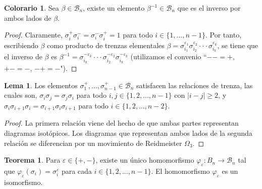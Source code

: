 \documentclass[12pt]{book}
\theoremstyle{definition}
\newtheorem{teor}{Teorema}[section]
\newtheorem{lema}{Lema}[section]
\newtheorem{colo}{Colorario}[section]
\begin{document}
\begin{colo}
\label{lema:inverso}
Sea $\beta\in\mathcal{B}_n$, existe un elemento $\beta^{-1}\in\mathcal{B}_n$ que es el inverso por ambos lados de $\beta$.
\end{colo}
\begin{proof}
Claramente, $\sigma_i^+\sigma_i^- = \sigma_i^-\sigma_i^+=1$ para todo $i\in\{1,\ldots,n-1\}$. Por tanto, escribiendo $\beta$ como producto de trenzas elementales $\beta = \sigma_{i_1}^{\varepsilon_1}\sigma_{i_2}^{\varepsilon_2}\cdot\cdot\cdot\sigma_{i_k}^{\varepsilon_k}$, se tiene que el inverso de $\beta$ es $\beta^{-1} = \sigma_{i_k}^{-\varepsilon_k}\cdot\cdot\cdot\sigma_{i_2}^{-\varepsilon_2}\sigma_{i_k}^{-\varepsilon_k}$ (utilizamos el convenio ``$--=+$, $+-=-$, $-+=-$").
 \end{proof}





\begin{lema}
Los elementos $\sigma_1^+,...,\sigma_{n-1}^+\in\mathcal{B}_n$ satisfacen las relaciones de trenza, las cuales son, $\sigma_i\sigma_j = \sigma_j\sigma_i$ para todo $i,j\in\{1,2,...,n-1\}$ con $|i-j|\geq 2$, y $\sigma_i\sigma_{i+1}\sigma_i =\sigma_{i+1}\sigma_i\sigma_{i+1}$ para todo $i\in\{1,2,...,n-2\}$.
\label{lema:rel_geom}
\end{lema}

\begin{proof} La primera relación viene del hecho de que ambas partes representan diagramas isotópicos. Los diagramas que representan ambos lados de la segunda relación se diferencian por un movimiento de Reidmeister $\Omega_3$.
\end{proof}

\begin{teor}
Para $\varepsilon \in\{+,-\}$, existe un único homomorfismo $\varphi_\varepsilon : B_n\rightarrow\mathcal{B}_n$ tal que $\varphi_\varepsilon(\sigma_i) = \sigma_i^\varepsilon$ para cada $i\in\{1,2,...,n-1\}$. El homomorfismo $\varphi_\varepsilon$ es un isomorfismo.
\end{teor}
\end{document}
